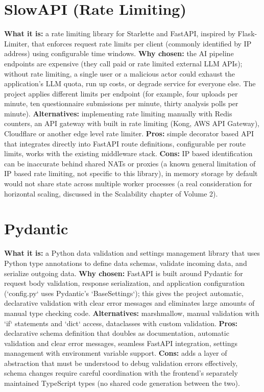 \documentclass[11pt,a4paper]{report}
\begin{document}
\section{SlowAPI (Rate Limiting)}
\textbf{What it is:} a rate limiting library for Starlette and FastAPI, inspired by Flask-Limiter, that enforces request rate limits per client (commonly identified by IP address) using configurable time windows.
\textbf{Why chosen:} the AI pipeline endpoints are expensive (they call paid or rate limited external LLM APIs); without rate limiting, a single user or a malicious actor could exhaust the application's LLM quota, run up costs, or degrade service for everyone else. The project applies different limits per endpoint (for example, four uploads per minute, ten questionnaire submissions per minute, thirty analysis polls per minute).
\textbf{Alternatives:} implementing rate limiting manually with Redis counters, an API gateway with built in rate limiting (Kong, AWS API Gateway), Cloudflare or another edge level rate limiter.
\textbf{Pros:} simple decorator based API that integrates directly into FastAPI route definitions, configurable per route limits, works with the existing middleware stack.
\textbf{Cons:} IP based identification can be inaccurate behind shared NATs or proxies (a known general limitation of IP based rate limiting, not specific to this library), in memory storage by default would not share state across multiple worker processes (a real consideration for horizontal scaling, discussed in the Scalability chapter of Volume 2).

\section{Pydantic}
\textbf{What it is:} a Python data validation and settings management library that uses Python type annotations to define data schemas, validate incoming data, and serialize outgoing data.
\textbf{Why chosen:} FastAPI is built around Pydantic for request body validation, response serialization, and application configuration (`config.py` uses Pydantic's `BaseSettings`); this gives the project automatic, declarative validation with clear error messages and eliminates large amounts of manual type checking code.
\textbf{Alternatives:} marshmallow, manual validation with `if` statements and `dict` access, dataclasses with custom validation.
\textbf{Pros:} declarative schema definition that doubles as documentation, automatic validation and clear error messages, seamless FastAPI integration, settings management with environment variable support.
\textbf{Cons:} adds a layer of abstraction that must be understood to debug validation errors effectively, schema changes require careful coordination with the frontend's separately maintained TypeScript types (no shared code generation between the two).
\end{document}
